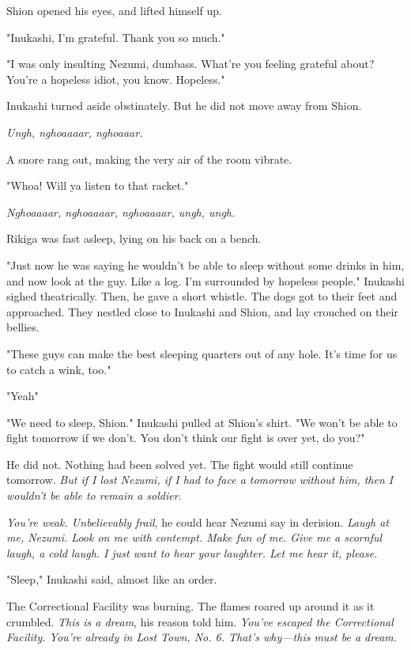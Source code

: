 Shion opened his eyes, and lifted himself up.

"Inukashi, I'm grateful. Thank you so much."

"I was only insulting Nezumi, dumbass. What're you feeling grateful
about? You're a hopeless idiot, you know. Hopeless."

Inukashi turned aside obstinately. But he did not move away from Shion.

\emph{Ungh, nghoaaaar, nghoaaar.}

A snore rang out, making the very air of the room vibrate.

"Whoa! Will ya listen to that racket."

\emph{Nghoaaaar, nghoaaaar, nghoaaaar, ungh, ungh.}

Rikiga was fast asleep, lying on his back on a bench.

"Just now he was saying he wouldn't be able to sleep without some drinks
in him, and now look at the guy. Like a log. I'm surrounded by hopeless
people." Inukashi sighed theatrically. Then, he gave a short whistle.
The dogs got to their feet and approached. They nestled close to
Inukashi and Shion, and lay crouched on their bellies.

"These guys can make the best sleeping quarters out of any hole. It's
time for us to catch a wink, too."

"Yeah\el "

"We need to sleep, Shion." Inukashi pulled at Shion's shirt. "We won't
be able to fight tomorrow if we don't. You don't think our fight is over
yet, do you?"

He did not. Nothing had been solved yet. The fight would still continue
tomorrow. \emph{But if I lost Nezumi, if I had to face a tomorrow without him,
then I wouldn't be able to remain a soldier.}

\emph{You're weak. Unbelievably frail}, he could hear Nezumi say in derision.
\emph{Laugh at me, Nezumi. Look on me with contempt. Make fun of me. Give me a
scornful laugh, a cold laugh. I just want to hear your laughter. Let me
hear it, please.}

"Sleep," Inukashi said, almost like an order.

\myspace

The Correctional Facility was burning. The flames roared up around it as
it crumbled. \emph{This is a dream}, his reason told him. \emph{You've escaped the
Correctional Facility. You're already in Lost Town, No. 6. That's
why---this must be a dream.}

